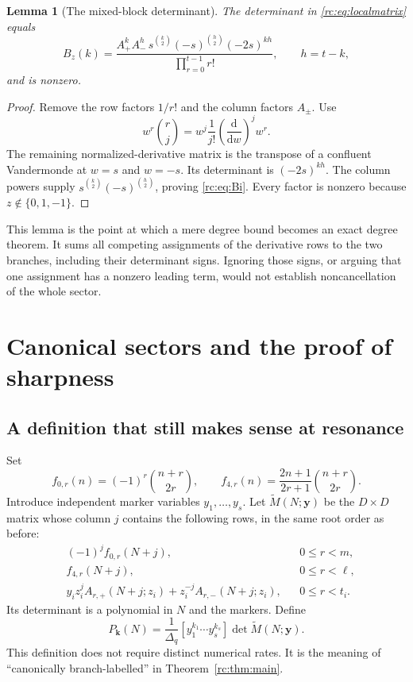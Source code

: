 \documentclass[11pt,a4paper]{article}
\numberwithin{equation}{section}
\newtheorem{lemma}[theorem]{Lemma}
\theoremstyle{definition}
\theoremstyle{remark}
\newcommand{\dd}{\mathrm d}
\newcommand{\bk}{\boldsymbol{k}}
\newcommand{\by}{\boldsymbol{y}}
\begin{document}
\begin{lemma}[The mixed-block determinant]\label{rc:lem:mixed}
The determinant in \eqref{rc:eq:localmatrix} equals
\begin{equation}\label{rc:eq:Bi}
 B_z(k)=
 \frac{A_+^k A_-^h\,
       s^{\binom k2}(-s)^{\binom h2}(-2s)^{kh}}
      {\prod_{r=0}^{t-1}r!},\qquad h=t-k,
\end{equation}
and is nonzero.
\end{lemma}
\begin{proof}
Remove the row factors $1/r!$ and the column factors $A_\pm$.
Use
\[
 w^r\binom rj
   =w^j\frac1{j!}\left(\frac{\dd}{\dd w}\right)^j w^r.
\]
The remaining normalized-derivative matrix is the transpose of a
confluent Vandermonde at $w=s$ and $w=-s$.  Its determinant is
$(-2s)^{kh}$.  The column powers supply
$s^{\binom k2}(-s)^{\binom h2}$, proving \eqref{rc:eq:Bi}.
Every factor is nonzero because $z\notin\{0,1,-1\}$.
\end{proof}

This lemma is the point at which a mere degree bound becomes an exact
degree theorem.  It sums all competing assignments of the derivative
rows to the two branches, including their determinant signs.  Ignoring
those signs, or arguing that one assignment has a nonzero leading term,
would not establish noncancellation of the whole sector.

\section{Canonical sectors and the proof of sharpness}\label{rc:sec:sharpness}

\subsection{A definition that still makes sense at resonance}
Set
\[
 f_{0,r}(n)=(-1)^r\binom{n+r}{2r},\qquad
 f_{4,r}(n)=\frac{2n+1}{2r+1}\binom{n+r}{2r}.
\]
Introduce independent marker variables $y_1,\ldots,y_s$.
Let $\widetilde M(N;\by)$ be the $D\times D$ matrix whose column $j$
contains the following rows, in the same root order as before:
\begin{align}
 &(-1)^j f_{0,r}(N+j),&&0\le r<m,\label{rc:eq:marked0}\\
 &f_{4,r}(N+j),&&0\le r<\ell,\label{rc:eq:marked4}\\
 &y_i z_i^j A_{r,+}(N+j;z_i)
       +z_i^{-j}A_{r,-}(N+j;z_i),&&0\le r<t_i.
 \label{rc:eq:markedoff}
\end{align}
Its determinant is a polynomial in $N$ and the markers.  Define
\begin{equation}\label{rc:eq:canonicalP}
 P_{\bk}(N)=\frac1{\Delta_q}
                   [y_1^{k_1}\cdots y_s^{k_s}]
                      \det\widetilde M(N;\by).
\end{equation}
This definition does not require distinct numerical rates.  It is the
meaning of ``canonically branch-labelled'' in Theorem~\ref{rc:thm:main}.
\end{document}
